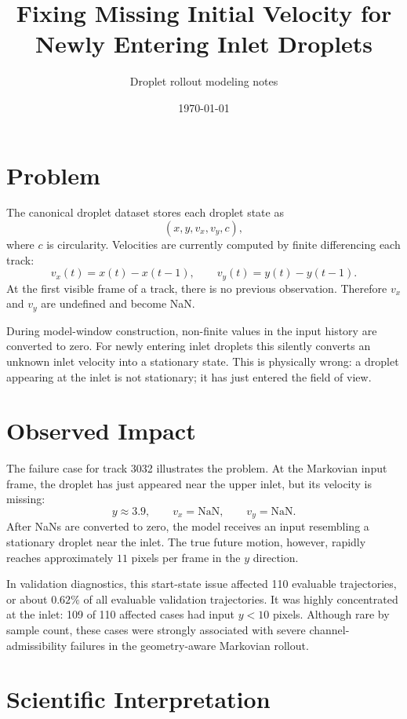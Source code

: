 \documentclass[11pt]{article}
\title{Fixing Missing Initial Velocity for Newly Entering Inlet Droplets}
\author{Droplet rollout modeling notes}
\date{\today}
\begin{document}
\maketitle

\section{Problem}

The canonical droplet dataset stores each droplet state as
\[
    (x, y, v_x, v_y, c),
\]
where \(c\) is circularity. Velocities are currently computed by finite
differencing each track:
\[
    v_x(t) = x(t) - x(t-1), \qquad
    v_y(t) = y(t) - y(t-1).
\]
At the first visible frame of a track, there is no previous observation.
Therefore \(v_x\) and \(v_y\) are undefined and become NaN.

During model-window construction, non-finite values in the input history are
converted to zero. For newly entering inlet droplets this silently converts an
unknown inlet velocity into a stationary state. This is physically wrong: a
droplet appearing at the inlet is not stationary; it has just entered the field
of view.

\section{Observed Impact}

The failure case for track 3032 illustrates the problem. At the Markovian input
frame, the droplet has just appeared near the upper inlet, but its velocity is
missing:
\[
    y \approx 3.9,\qquad v_x = \mathrm{NaN},\qquad v_y = \mathrm{NaN}.
\]
After NaNs are converted to zero, the model receives an input resembling a
stationary droplet near the inlet. The true future motion, however, rapidly
reaches approximately \(11\) pixels per frame in the \(y\) direction.

In validation diagnostics, this start-state issue affected 110 evaluable
trajectories, or about \(0.62\%\) of all evaluable validation trajectories. It
was highly concentrated at the inlet: 109 of 110 affected cases had input
\(y < 10\) pixels. Although rare by sample count, these cases were strongly
associated with severe channel-admissibility failures in the geometry-aware
Markovian rollout.

\section{Scientific Interpretation}
\end{document}
